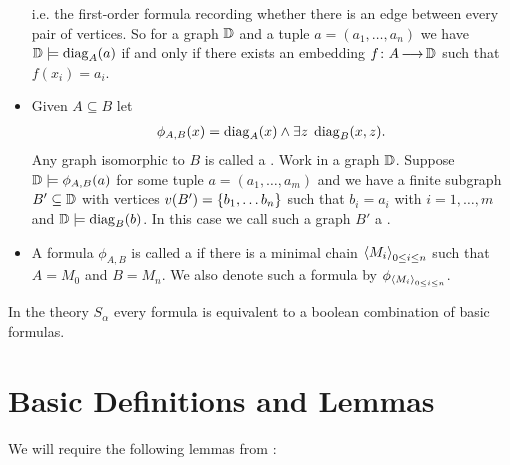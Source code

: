 \begin{Definition}
\begin{itemize}
    i.e. the first-order formula recording whether there is an edge between every pair of vertices.
    So for a graph $\mathbb D$ and a tuple $a = (a_1, \ldots, a_n)$ we have $\mathbb D \models \operatorname{diag}_A(a)$ if and only if
    there exists an embedding $f \colon A \operatorname{\longrightarrow} \mathbb D$ such that $f(x_i) = a_i$.
  \item Given $A \subseteq B$ let 
    \begin{align*}
      \phi_{A,B}(x) = \operatorname{diag}_A(x) \wedge \exists z \; \operatorname{diag}_B(x, z).
    \end{align*}
    Any graph isomorphic to $B$ is called a .
    Work in a graph $\mathbb D$.
    Suppose $\mathbb D \models \phi_{A,B}(a)$ for some tuple $a = (a_1, \ldots, a_m)$
    and we have a finite subgraph $B' \subseteq \mathbb D$ with vertices $v(B') = \left\{b_1, \ldots b_n\right\}$
    such that $b_i = a_i$ with $i = 1, \ldots, m$ and $\mathbb D \models \operatorname{diag}_B(b)$.
    In this case we call such a graph $B'$ a .
  \item A formula $\phi_{A,B}$ is called a 
    if there is a minimal chain $\left\langle M_i \right\rangle_{0 \leq i \leq n}$
    such that $A = M_0$ and $B = M_n$.
    We also denote such a formula by $\phi_{\left\langle M_i \right\rangle_{0 \leq i \leq n}}$. 
  \end{itemize}
\end{Definition}
 
\begin{Theorem} 
  In the theory $S_\alpha$ every formula is equivalent to a boolean combination of basic formulas.
\end{Theorem}

\section{Basic Definitions and Lemmas}
We will require the following lemmas from \cite{laskowski}:

